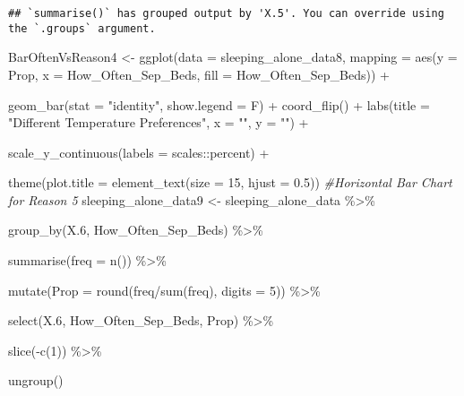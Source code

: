 \documentclass[
]{article}
\newenvironment{Shaded}{\begin{snugshade}}{\end{snugshade}}
\newcommand{\AttributeTok}[1]{\textcolor[rgb]{0.77,0.63,0.00}{#1}}
\newcommand{\CommentTok}[1]{\textcolor[rgb]{0.56,0.35,0.01}{\textit{#1}}}
\newcommand{\DecValTok}[1]{\textcolor[rgb]{0.00,0.00,0.81}{#1}}
\newcommand{\FloatTok}[1]{\textcolor[rgb]{0.00,0.00,0.81}{#1}}
\newcommand{\FunctionTok}[1]{\textcolor[rgb]{0.00,0.00,0.00}{#1}}
\newcommand{\NormalTok}[1]{#1}
\newcommand{\OtherTok}[1]{\textcolor[rgb]{0.56,0.35,0.01}{#1}}
\newcommand{\SpecialCharTok}[1]{\textcolor[rgb]{0.00,0.00,0.00}{#1}}
\newcommand{\StringTok}[1]{\textcolor[rgb]{0.31,0.60,0.02}{#1}}
\begin{document}
\begin{verbatim}
## `summarise()` has grouped output by 'X.5'. You can override using the `.groups` argument.
\end{verbatim}

\begin{Shaded}
\begin{Highlighting}[]
\NormalTok{BarOftenVsReason4 }\OtherTok{\textless{}{-}} \FunctionTok{ggplot}\NormalTok{(}\AttributeTok{data =}\NormalTok{ sleeping\_alone\_data8,}
                               \AttributeTok{mapping =} \FunctionTok{aes}\NormalTok{(}\AttributeTok{y =}\NormalTok{ Prop,}
                                             \AttributeTok{x =}\NormalTok{ How\_Often\_Sep\_Beds,}
                                             \AttributeTok{fill =}\NormalTok{ How\_Often\_Sep\_Beds)) }\SpecialCharTok{+}
  
  \FunctionTok{geom\_bar}\NormalTok{(}\AttributeTok{stat =} \StringTok{"identity"}\NormalTok{,}
           \AttributeTok{show.legend =}\NormalTok{ F) }\SpecialCharTok{+} 
  \FunctionTok{coord\_flip}\NormalTok{() }\SpecialCharTok{+} 
  \FunctionTok{labs}\NormalTok{(}\AttributeTok{title =} \StringTok{"Different Temperature Preferences"}\NormalTok{,}
       \AttributeTok{x =} \StringTok{""}\NormalTok{,}
       \AttributeTok{y =} \StringTok{""}\NormalTok{) }\SpecialCharTok{+}
  
  \FunctionTok{scale\_y\_continuous}\NormalTok{(}\AttributeTok{labels =}\NormalTok{ scales}\SpecialCharTok{::}\NormalTok{percent) }\SpecialCharTok{+}
  
  \FunctionTok{theme}\NormalTok{(}\AttributeTok{plot.title =} \FunctionTok{element\_text}\NormalTok{(}\AttributeTok{size =} \DecValTok{15}\NormalTok{, }\AttributeTok{hjust =} \FloatTok{0.5}\NormalTok{))}
\CommentTok{\#Horizontal Bar Chart for Reason 5}
\NormalTok{sleeping\_alone\_data9 }\OtherTok{\textless{}{-}}\NormalTok{ sleeping\_alone\_data }\SpecialCharTok{\%\textgreater{}\%} 
  
  \FunctionTok{group\_by}\NormalTok{(X}\FloatTok{.6}\NormalTok{, How\_Often\_Sep\_Beds) }\SpecialCharTok{\%\textgreater{}\%} 
  
  \FunctionTok{summarise}\NormalTok{(}\AttributeTok{freq =} \FunctionTok{n}\NormalTok{()) }\SpecialCharTok{\%\textgreater{}\%} 
  
  \FunctionTok{mutate}\NormalTok{(}\AttributeTok{Prop =} \FunctionTok{round}\NormalTok{(freq}\SpecialCharTok{/}\FunctionTok{sum}\NormalTok{(freq), }\AttributeTok{digits =} \DecValTok{5}\NormalTok{)) }\SpecialCharTok{\%\textgreater{}\%} 
  
  \FunctionTok{select}\NormalTok{(X}\FloatTok{.6}\NormalTok{, How\_Often\_Sep\_Beds, Prop) }\SpecialCharTok{\%\textgreater{}\%} 
  
  \FunctionTok{slice}\NormalTok{(}\SpecialCharTok{{-}}\FunctionTok{c}\NormalTok{(}\DecValTok{1}\NormalTok{)) }\SpecialCharTok{\%\textgreater{}\%} 
  
  \FunctionTok{ungroup}\NormalTok{()}
\end{Highlighting}
\end{Shaded}
\end{document}
